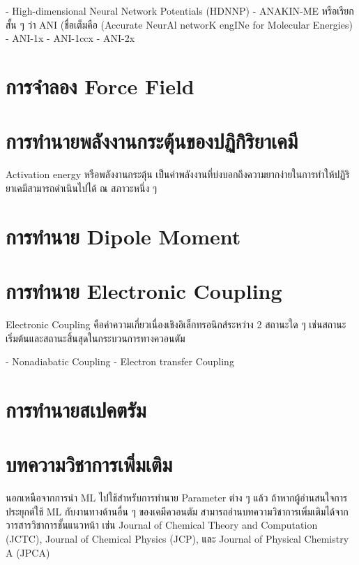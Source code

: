- High-dimensional Neural Network Potentials (HDNNP)\cite{behler2007}
- ANAKIN-ME หรือเรียกสั้น ๆ ว่า ANI (ชื่อเต็มคือ (Accurate NeurAl networK engINe for Molecular Energies)
    - ANI-1x\cite{smith2017}
    - ANI-1ccx\cite{smith2018}
    - ANI-2x\cite{smith2019}

\section{การจำลอง Force Field}

\section{การทำนายพลังงานกระตุ้นของปฏิกิริยาเคมี}

Activation energy หรือพลังงานกระตุ้น เป็นค่าพลังงานที่บ่งบอกถึงความยากง่ายในการทำให้ปฏิริยาเคมีสามารถดำเนินไปได้ ณ สภาวะหนึ่ง ๆ

\section{การทำนาย Dipole Moment}

\section{การทำนาย Electronic Coupling}

Electronic Coupling คือค่าความเกี่ยวเนื่องเชิงอิเล็กทรอนิกส์ระหว่าง 2 สถานะใด ๆ เช่นสถานะเริ่มต้นและสถานะสิ้นสุดในกระบวนการทางควอนตัม

- Nonadiabatic Coupling
- Electron transfer Coupling

\section{การทำนายสเปคตรัม}


\section{บทความวิชาการเพิ่มเติม}

นอกเหนือจากการนำ ML ไปใช้สำหรับการทำนาย Parameter ต่าง ๆ แล้ว ถ้าหากผู้อ่านสนใจการประยุกต์ใช้ ML กับงานทางด้านอื่น ๆ ของเคมีควอนตัม 
สามารถอ่านบทความวิชาการเพิ่มเติมได้จากวารสารวิชาการชั้นแนวหน้า เช่น Journal of Chemical Theory and Computation (JCTC), 
Journal of Chemical Physics (JCP), และ Journal of Physical Chemistry A (JPCA)

